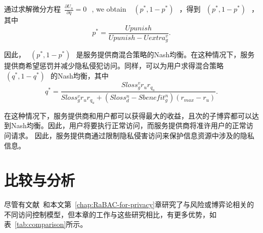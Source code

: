 通过求解微分方程~$\frac{\partial U_n}{\partial q}=0~$~, we obtain ~$~(p^*,1-p^*)~$~，得到~$~(p^*,1-p^*)~$~，其中
\begin{equation}
p^*=\dfrac{Upunish}{Upunish-Uextra_g^v}.
\end{equation}

因此，~$~(p^*,1-p^*)~$~是服务提供商混合策略的Nash均衡。在这种情况下，服务提供商希望惩罚并减少隐私侵犯访问。同样，可以为用户求得混合策略~$~(q^*,1-q^*)~$~的Nash均衡，其中
\begin{equation}
q^*=\dfrac{Sloss_g^v r_u r_{q_u}}{Sloss_g^v r_u  r_{q_u} +(Sloss_d^n -Sbenefit_g^n)(r_{max}-r_u)}.
\end{equation}

在这种情况下，服务提供商和用户都可以获得最大的收益，且次的子博弈都可以达到Nash均衡。因此，用户将要执行正常访问，而服务提供商将准许用户的正常访问请求。 因此，服务提供商通过限制隐私侵害访问来保护信息资源中涉及的隐私信息。

\section{比较与分析}
\label{sec:comparison}

尽管有文献~\cite{ni2010risk,wang2011quantified,shaikh2012dynamic,santos2016framework,wang2019game,zhang2015towards,zhen2015risk,zhang2018privacy,gao2018game,liu2016dynamic,helil2017non,hu2014game}和本文第~\ref{chap:RaBAC-for-privacy}章研究了与风险或博弈论相关的不同访问控制模型，但本章的工作与这些研究相比，有更多优势，如表~\ref{tab:comparison}所示。

